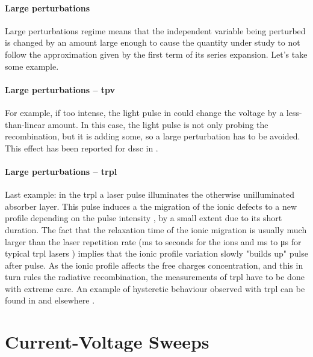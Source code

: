 		\paragraph{Large perturbations} \label{perturbation}
		Large perturbations regime means that the independent variable being perturbed is changed by an amount large enough to cause the quantity under study to not follow the approximation given by the first term of its series expansion.
		Let's take some example.

		\paragraph{Large perturbations -- \gls{tpv}}
		For example, if too intense, the light pulse in  could change the voltage by a less-than-linear amount.
		In this case, the light pulse is not only probing the recombination, but it is adding some, so a large perturbation has to be avoided.
		This effect has been reported for \gls{dssc} in .

		\paragraph{Large perturbations -- \gls{trpl}}
		Last example: in the \glsdesc{trpl} a laser pulse illuminates the otherwise unilluminated absorber layer.
		This pulse induces a the migration of the ionic defects to a new profile depending on the pulse intensity \cite{Levine2018}, by a small extent due to its short duration.
		The fact that the relaxation time of the ionic migration is usually much larger than the laser repetition rate (\si{\ms} to seconds for the ions \cite{Jacobs2018} and \si{\ms} to \si{\us} for typical \gls{trpl} lasers \cite{EdinburghInstruments}) implies that the ionic profile variation slowly "builds up" pulse after pulse.
		As the ionic profile affects the free charges concentration, and this in turn rules the radiative recombination, the measurements of \gls{trpl} have to be done with extreme care.
		An example of hysteretic behaviour observed with \gls{trpl} can be found in  and elsewhere \cite{Chen2015,Chen2017}.

\section{Current-Voltage Sweeps}

